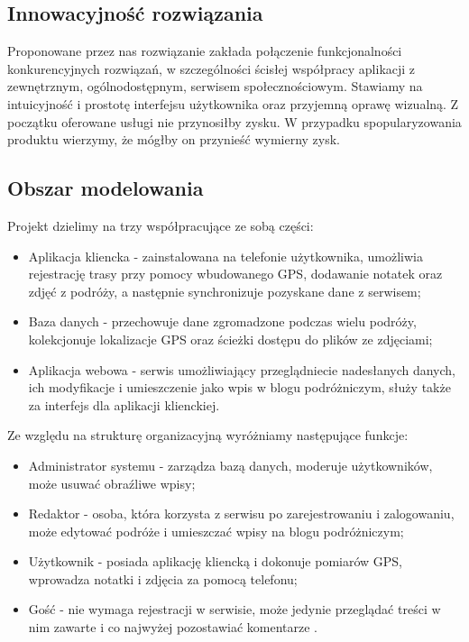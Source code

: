 \documentclass[11pt,a4paper]{article}
\begin{document}
\subsection {Innowacyjność rozwiązania}
Proponowane przez nas rozwiązanie zakłada połączenie funkcjonalności konkurencyjnych rozwiązań, w szczególności ścisłej współpracy aplikacji z zewnętrznym, ogólnodostępnym, serwisem społecznościowym. Stawiamy na intuicyjność i prostotę interfejsu użytkownika oraz przyjemną oprawę wizualną. Z początku oferowane usługi nie przynosiłby zysku. W przypadku spopularyzowania produktu wierzymy, że mógłby on przynieść wymierny zysk.

\subsection {Obszar modelowania}

Projekt dzielimy na trzy współpracujące ze sobą części:
\begin{itemize}
\item Aplikacja kliencka - zainstalowana na telefonie użytkownika, umożliwia rejestrację trasy przy pomocy wbudowanego GPS, dodawanie notatek oraz zdjęć z podróży, a następnie synchronizuje pozyskane dane z serwisem;
\item Baza danych - przechowuje dane zgromadzone podczas wielu podróży, kolekcjonuje lokalizacje GPS oraz ścieżki dostępu do plików ze zdjęciami;
\item Aplikacja webowa - serwis umożliwiający przeglądniecie nadesłanych danych, ich modyfikacje i umieszczenie jako wpis w blogu podróżniczym, służy także za interfejs dla aplikacji klienckiej.
\end{itemize}

Ze względu na strukturę organizacyjną wyróżniamy następujące funkcje:
\begin{itemize}
\item Administrator systemu - zarządza bazą danych, moderuje użytkowników, może usuwać obraźliwe wpisy;
\item Redaktor - osoba, która korzysta z serwisu po zarejestrowaniu i zalogowaniu, może edytować podróże i umieszczać wpisy na blogu podróżniczym;
\item Użytkownik - posiada aplikację kliencką i dokonuje pomiarów GPS, wprowadza notatki i zdjęcia za pomocą telefonu;
\item Gość - nie wymaga rejestracji w serwisie, może jedynie przeglądać treści w nim zawarte i co najwyżej pozostawiać komentarze .
\end{itemize}
\end{document}
